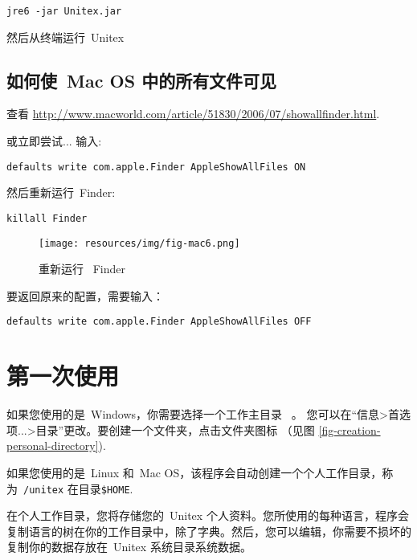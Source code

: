 \bigskip
\noindent \verb+jre6 -jar Unitex.jar+

\bigskip
\noindent 然后从终端运行\ Unitex




\subsection{如何使\ Mac OS 中的所有文件可见}
\noindent 查看
\url{http://www.macworld.com/article/51830/2006/07/showallfinder.html}.

\bigskip
\noindent 或立即尝试... 输入: 

\bigskip
\verb+defaults write com.apple.Finder AppleShowAllFiles ON+

\bigskip
\noindent 然后重新运行\ Finder:

\bigskip
\verb+killall Finder+

\begin{figure}[!h]
\begin{center}
\texttt{[image: resources/img/fig-mac6.png]}
\caption{重新运行 \ Finder\label{fig-mac6}}
\end{center}
\end{figure}

\bigskip
\noindent 要返回原来的配置，需要输入：

\bigskip
\verb+defaults write com.apple.Finder AppleShowAllFiles OFF+


\section{第一次使用}
如果您使用的是\ Windows，你需要选择一个工作主目录
\ 。 您可以在“信息>首选项...>目录”更改。要创建一个文件夹，点击文件夹图标
（见图 \ref{fig-creation-personal-directory}).

\bigskip
\noindent 如果您使用的是\ Linux 和\ Mac OS，该程序会自动创建一个个人工作目录，称为\ \verb+/unitex+ 在目录\verb+$HOME+. 

\bigskip
\noindent 在个人工作目录，您将存储您的\ Unitex 个人资料。您所使用的每种语言，程序会复制语言的树在你的工作目录中，除了字典。然后，您可以编辑，你需要不损坏的复制你的数据存放在\ Unitex 系统目录系统数据。


